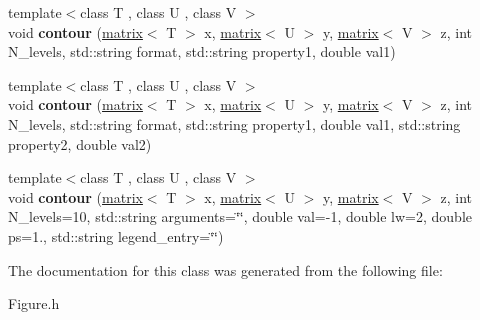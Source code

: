\begin{DoxyCompactItemize}
\item 
\hypertarget{classkeycpp_1_1_figure_a953e4e89fdb08dc90c780bcd757ac70d}{{\footnotesize template$<$class T , class U , class V $>$ }\\void {\bfseries contour} (\hyperlink{classkeycpp_1_1matrix}{matrix}$<$ T $>$ x, \hyperlink{classkeycpp_1_1matrix}{matrix}$<$ U $>$ y, \hyperlink{classkeycpp_1_1matrix}{matrix}$<$ V $>$ z, int N\-\_\-levels, std\-::string format, std\-::string property1, double val1)}\label{classkeycpp_1_1_figure_a953e4e89fdb08dc90c780bcd757ac70d}

\item 
\hypertarget{classkeycpp_1_1_figure_ac95962ed0f5adac640061ce5bfe3f336}{{\footnotesize template$<$class T , class U , class V $>$ }\\void {\bfseries contour} (\hyperlink{classkeycpp_1_1matrix}{matrix}$<$ T $>$ x, \hyperlink{classkeycpp_1_1matrix}{matrix}$<$ U $>$ y, \hyperlink{classkeycpp_1_1matrix}{matrix}$<$ V $>$ z, int N\-\_\-levels, std\-::string format, std\-::string property1, double val1, std\-::string property2, double val2)}\label{classkeycpp_1_1_figure_ac95962ed0f5adac640061ce5bfe3f336}

\item 
\hypertarget{classkeycpp_1_1_figure_a747a5be7253acbaf08a4a52971d261c3}{{\footnotesize template$<$class T , class U , class V $>$ }\\void {\bfseries contour} (\hyperlink{classkeycpp_1_1matrix}{matrix}$<$ T $>$ x, \hyperlink{classkeycpp_1_1matrix}{matrix}$<$ U $>$ y, \hyperlink{classkeycpp_1_1matrix}{matrix}$<$ V $>$ z, int N\-\_\-levels=10, std\-::string arguments=\char`\"{}\char`\"{}, double val=-\/1, double lw=2, double ps=1., std\-::string legend\-\_\-entry=\char`\"{}\char`\"{})}\label{classkeycpp_1_1_figure_a747a5be7253acbaf08a4a52971d261c3}

\end{DoxyCompactItemize}


The documentation for this class was generated from the following file\-:\begin{DoxyCompactItemize}
\item 
Figure.\-h\end{DoxyCompactItemize}
